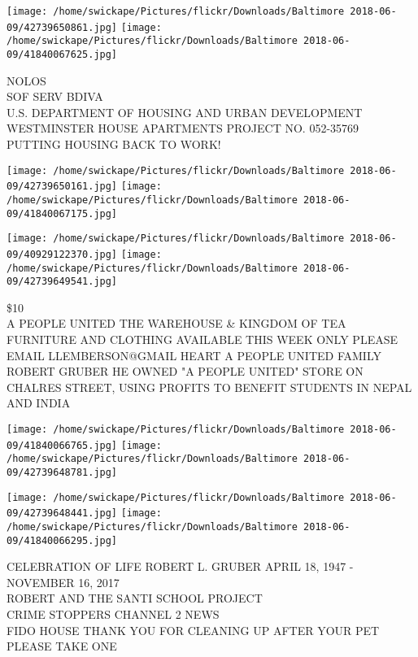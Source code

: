 \documentclass[10pt,letterpaper]{article}
\begin{document}
\texttt{[image: /home/swickape/Pictures/flickr/Downloads/Baltimore 2018-06-09/42739650861.jpg]}
\texttt{[image: /home/swickape/Pictures/flickr/Downloads/Baltimore 2018-06-09/41840067625.jpg]}

NOLOS\\
SOF SERV BDIVA\\
U.S. DEPARTMENT OF HOUSING AND URBAN DEVELOPMENT WESTMINSTER HOUSE APARTMENTS PROJECT NO. 052{-}35769\\
PUTTING HOUSING BACK TO WORK!\\
\pagebreak

\texttt{[image: /home/swickape/Pictures/flickr/Downloads/Baltimore 2018-06-09/42739650161.jpg]}
\texttt{[image: /home/swickape/Pictures/flickr/Downloads/Baltimore 2018-06-09/41840067175.jpg]}

\texttt{[image: /home/swickape/Pictures/flickr/Downloads/Baltimore 2018-06-09/40929122370.jpg]}
\texttt{[image: /home/swickape/Pictures/flickr/Downloads/Baltimore 2018-06-09/42739649541.jpg]}

\$10\\
A PEOPLE UNITED THE WAREHOUSE \& KINGDOM OF TEA\\
FURNITURE AND CLOTHING AVAILABLE THIS WEEK ONLY PLEASE EMAIL LLEMBERSON@GMAIL HEART A PEOPLE UNITED FAMILY\\
ROBERT GRUBER HE OWNED "A PEOPLE UNITED" STORE ON CHALRES STREET, USING PROFITS TO BENEFIT STUDENTS IN NEPAL AND INDIA\\
\pagebreak

\texttt{[image: /home/swickape/Pictures/flickr/Downloads/Baltimore 2018-06-09/41840066765.jpg]}
\texttt{[image: /home/swickape/Pictures/flickr/Downloads/Baltimore 2018-06-09/42739648781.jpg]}

\texttt{[image: /home/swickape/Pictures/flickr/Downloads/Baltimore 2018-06-09/42739648441.jpg]}
\texttt{[image: /home/swickape/Pictures/flickr/Downloads/Baltimore 2018-06-09/41840066295.jpg]}

CELEBRATION OF LIFE ROBERT L. GRUBER APRIL 18, 1947 {-} NOVEMBER 16, 2017\\
ROBERT AND THE SANTI SCHOOL PROJECT\\
CRIME STOPPERS CHANNEL 2 NEWS\\
FIDO HOUSE THANK YOU FOR CLEANING UP AFTER YOUR PET PLEASE TAKE ONE\\
\pagebreak
\end{document}
